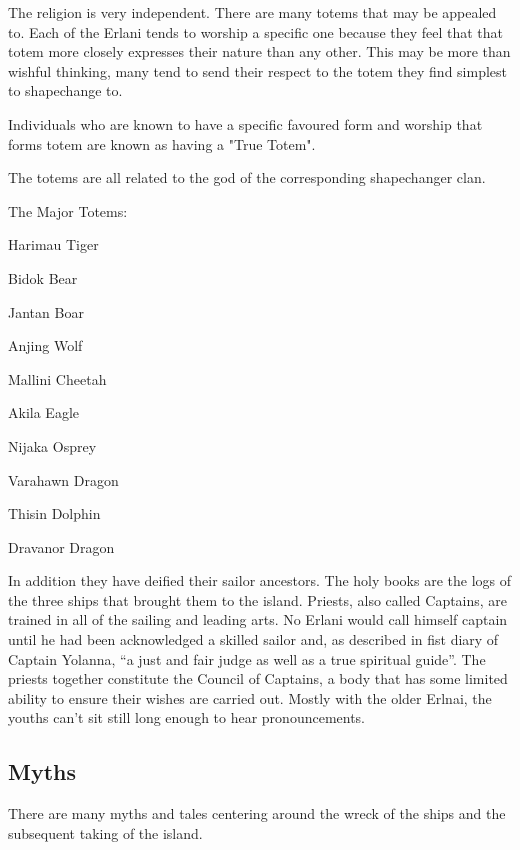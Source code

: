 The religion is very independent. There are many totems that may be
appealed to. Each of the Erlani tends to worship a specific one
because they feel that that totem more closely expresses their nature
than any other. This may be more than wishful thinking, many tend to
send their respect to the totem they find simplest to shapechange to.

Individuals who are known to have a specific favoured form and
worship that forms totem are known as having a "True Totem".

The totems are all related to the god of the corresponding
shapechanger clan.

The Major Totems:

\begin{relate}
        \item[Harimau] Tiger
        \item[Bidok] Bear
        \item[Jantan] Boar
        \item[Anjing] Wolf
        \item[Mallini] Cheetah
        \item[Akila] Eagle
        \item[Nijaka] Osprey
        \item[Varahawn] Dragon
        \item[Thisin] Dolphin
        \item[Dravanor] Dragon 
\end{relate}

In addition they have deified their sailor ancestors. The holy books
are the logs of the three ships that brought them to the island.
Priests, also called Captains, are trained in all of the sailing
and leading arts. No Erlani would call himself captain until he had
been acknowledged a skilled sailor and, as described in fist diary of
Captain Yolanna, ``a just and fair judge as well as a true spiritual guide''.
The priests together constitute the Council of Captains, a body that 
has some limited ability to ensure their wishes are carried out. Mostly
with the older Erlnai, the youths can't sit still long enough to 
hear pronouncements.

\subsection{Myths}

There are many myths and tales centering around the wreck of the 
ships and the subsequent taking of the island. 

